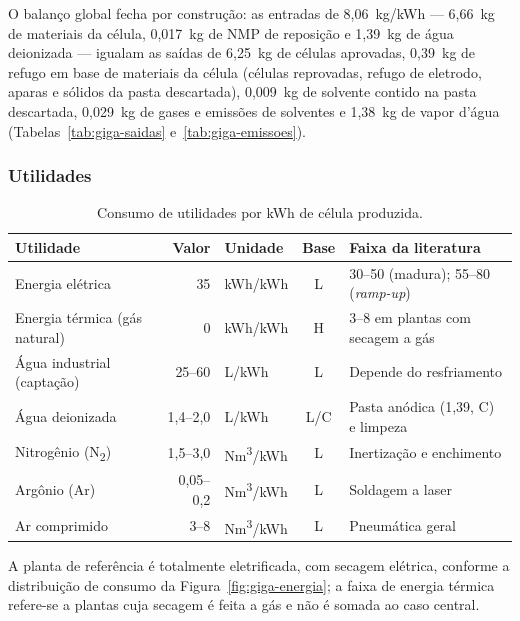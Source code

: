O balanço global fecha por construção: as entradas de 8,06~kg/kWh — 6,66~kg de
materiais da célula, 0,017~kg de NMP de reposição e 1,39~kg de água deionizada —
igualam as saídas de 6,25~kg de células aprovadas, 0,39~kg de refugo em base de
materiais da célula (células reprovadas, refugo de eletrodo, aparas e sólidos da
pasta descartada), 0,009~kg de solvente contido na pasta descartada, 0,029~kg de
gases e emissões de solventes e 1,38~kg de vapor d'água
(Tabelas~\ref{tab:giga-saidas} e~\ref{tab:giga-emissoes}).

\subsubsection{Utilidades}

\begin{table}[H]
\centering
\caption{Consumo de utilidades por kWh de célula produzida.}
\label{tab:giga-utilidades}
\small
\renewcommand{\arraystretch}{1.15}
\begin{tabularx}{\textwidth}{@{} >{\raggedright\arraybackslash}p{4.6cm} r l c X @{}}
\toprule
\textbf{Utilidade} & \textbf{Valor} & \textbf{Unidade} & \textbf{Base} & \textbf{Faixa da literatura} \\
\midrule
Energia elétrica & 35 & kWh/kWh & L & 30--50 (madura); 55--80 (\textit{ramp-up}) \\
Energia térmica (gás natural) & 0 & kWh/kWh & H & 3--8 em plantas com secagem a gás \\
Água industrial (captação) & 25--60 & L/kWh & L & Depende do resfriamento \\
Água deionizada & 1,4--2,0 & L/kWh & L/C & Pasta anódica (1,39, C) e limpeza \\
Nitrogênio (N\textsubscript{2}) & 1,5--3,0 & Nm\textsuperscript{3}/kWh & L & Inertização e enchimento \\
Argônio (Ar) & 0,05--0,2 & Nm\textsuperscript{3}/kWh & L & Soldagem a laser \\
Ar comprimido & 3--8 & Nm\textsuperscript{3}/kWh & L & Pneumática geral \\
\bottomrule
\end{tabularx}
\end{table}

A planta de referência é totalmente eletrificada, com secagem elétrica, conforme
a distribuição de consumo da Figura~\ref{fig:giga-energia}; a faixa de energia
térmica refere-se a plantas cuja secagem é feita a gás e não é somada ao caso
central.

